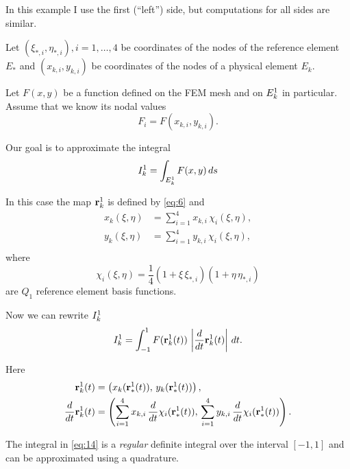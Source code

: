 \documentclass[11pt]{article}
\begin{document}
In this example I use the first (``left'') side, but computations for
all sides are similar.

Let $(\xi_{*,i}, \eta_{*,i}), i = 1,\dots,4$ be coordinates of the nodes
of the reference element $E_{*}$ and $(x_{k,i}, y_{k,i})$ be coordinates
of the nodes of a physical element $E_{k}$.

Let $F(x,y)$ be a function defined on the FEM mesh and on $E_{k}^{1}$ in
particular. Assume that we know its nodal values
\begin{equation}
\label{eq:10}
F_{i} = F(x_{k,i}, y_{k,i}).
\end{equation}

Our goal is to approximate the integral
\begin{equation}
\label{eq:11}
I_{k}^{1} = \int_{E_{k}^{1}} F(x,y)\, ds
\end{equation}

In this case the map $\mathbf{r}_{k}^{1}$ is defined by \eqref{eq:6} and
\begin{equation}
\label{eq:12}
\begin{aligned}
x_{k}(\xi,\eta) &= \sum_{i=1}^{4} x_{k,i}\, \chi_{i}(\xi, \eta),\\
y_{k}(\xi,\eta) &= \sum_{i=1}^{4} y_{k,i}\, \chi_{i}(\xi, \eta),\\
\end{aligned}
\end{equation}
where
\begin{equation}
\label{eq:13}
\chi_{i}(\xi,\eta) = \frac14 (1 + \xi\,\xi_{*,i})(1 + \eta\,\eta_{*,i})
\end{equation}
are $Q_{1}$ reference element basis functions.

Now we can rewrite $I_{k}^{1}$
\begin{equation}
\label{eq:14}
I_{k}^{1} = \int_{-1}^{1} F(\mathbf{r}_{k}^{1}(t))\, \left|\frac{d}{dt}\mathbf{r}_{k}^{1}(t) \right|\, dt.
\end{equation}

Here
\begin{align}
\label{eq:15}
\mathbf{r}_{k}^{1}(t) &= \left( x_{k}(\mathbf{r}_{*}^{1}(t)),\, y_{k}(\mathbf{r}_{*}^{1}(t)) \right),\\
\frac{d}{dt} \mathbf{r}_{k}^{1}(t) &= \left( \sum_{i=1}^{4} x_{k,i}\, \frac{d}{dt}\chi_{i}(\mathbf{r}_{*}^{1}(t)),\,
                                  \sum_{i=1}^{4} y_{k,i}\, \frac{d}{dt}\chi_{i}(\mathbf{r}_{*}^{1}(t))  \right).
\end{align}

The integral in \eqref{eq:14} is a \emph{regular} definite integral over
the interval $[-1, 1]$ and can be approximated using a quadrature.
\end{document}

